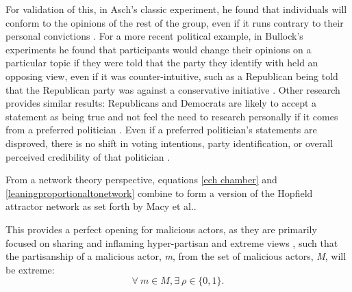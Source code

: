 \documentclass[preprint,review,12pt]{elsarticle}
\begin{document}
 For validation of this, in Asch's classic experiment, he found that individuals will conform to the opinions of the rest of the group, even if it runs contrary to their personal convictions \cite{asch1956studies}. For a more recent political example, in Bullock's experiments he found that participants would change their opinions on a particular topic if they were told that the party they identify with held an opposing view, even if it was counter-intuitive, such as a Republican being told that the Republican party was against a conservative initiative \cite{bullock2007experiments}. Other research provides similar results: Republicans and Democrats are likely to accept a statement as being true and not feel the need to research personally if it comes from a preferred politician \cite{housholder2014facebook}. Even if a preferred politician's statements are disproved, there is no shift in voting intentions, party identification, or overall perceived credibility of that politician \cite{swire2017processing}. 
 
 From a network theory perspective, equations \ref{ech chamber} and \ref{leaningproportionaltonetwork} combine to form a version of the Hopfield attractor network \cite{hopfield1982neural,hopfield1985neural,nowak1998toward,kitts1999structural} as set forth by Macy et al.\cite{macy2003polarization}. 
 
This provides a perfect opening for malicious actors, as they are primarily focused on sharing and inflaming hyper-partisan and extreme views \cite{shin2018diffusion,bastos2019brexit,hegelich2016social,mueller2019mueller}, such that the partisanship of a malicious actor, \textit{m}, from the set of malicious actors, \textit{M}, will be extreme: 
\begin{equation}
\label{trollpartisanship}
\forall \ m \in M, \exists \ \rho \in \{0,1\}.
\end{equation}
\end{document}
